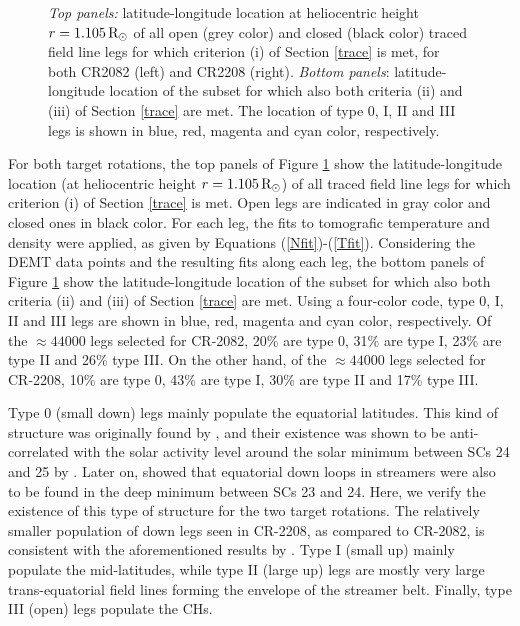 \documentclass[namedreferences]{solarphysics}
\newcommand{\mrsun}{{\rm R_\odot}}
\begin{document}
\begin{article}
\begin{figure}[h!]
\begin{center}
\caption{\emph{Top panels:} {latitude-longitude location at heliocentric height $r=1.105\,\mrsun$ of all open (grey color) and closed (black color) traced field line legs for which criterion (i) of Section \ref{trace} is met, for both CR2082 (left) and CR2208 (right). \emph{Bottom panels}: latitude-longitude location of the subset for which also both criteria (ii) and (iii) of Section \ref{trace} are met. {The location of} type 0, I, II and III legs {is shown} in blue, red, {magenta and cyan} color, respectively.}}
\label{rpoint_demt}
\end{center}
\end{figure}

{For both target rotations, the top panels of Figure \ref{rpoint_demt} show the latitude-longitude location (at heliocentric height $r=1.105\,\mrsun$) of all traced field line legs for which criterion (i) of Section \ref{trace} is met. Open legs are indicated in gray color and closed ones in black color. For each leg, the fits to tomografic temperature and density were applied, as given by Equations (\ref{Nfit})-(\ref{Tfit}). Considering the DEMT data points and the resulting fits along each leg, the bottom panels of Figure \ref{rpoint_demt} show the latitude-longitude location of the subset for which also both criteria (ii) and (iii) of Section \ref{trace} are met. Using a four-color code, type 0, I, II and III legs are shown in blue, red, {magenta and cyan} color, respectively.} Of the {$\approx 44000$} legs selected for CR-2082, 20\% are type 0, 31\% are type I, 23\% are type II and 26\% type III. On the other hand, of the {$\approx 44000$} legs selected for CR-2208, 10\% are type 0, 43\% are type I, 30\% are type II and 17\% type III.

{Type 0 (small down) legs mainly populate the equatorial latitudes. This kind of structure was originally found by \citet{huang_2012}, and their existence was shown to be anti-correlated with the solar activity level {around the solar minimum between SCs 24 and 25} by \citet{nuevo_2013}. Later on, \citet{lloveras_2017} showed {that} equatorial down loops in streamers were also to be found in the deep minimum between SCs {23 and 24}. Here, we verify the existence of this type of structure for the two target rotations. The relatively smaller population of down legs seen in CR-2208, as compared to CR-2082, is consistent with the aforementioned results by \citet{nuevo_2013}. Type I (small up) mainly populate the mid-latitudes, while type II (large up) legs are mostly very large trans-equatorial field lines forming the envelope of the streamer belt. Finally, type III (open) legs populate the CHs.}


\end{article}
\end{document}
